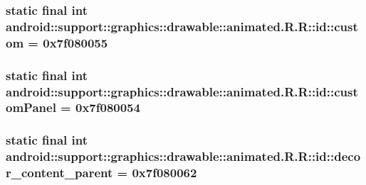 \hypertarget{classandroid_1_1support_1_1graphics_1_1drawable_1_1animated_1_1_r_1_1id_7882cd29792180a55eddba12ffd315d0}{
\subsubsection[{custom}]{\setlength{\rightskip}{0pt plus 5cm}static final int android::support::graphics::drawable::animated.R.R::id::custom = 0x7f080055}}
\label{classandroid_1_1support_1_1graphics_1_1drawable_1_1animated_1_1_r_1_1id_7882cd29792180a55eddba12ffd315d0}


\hypertarget{classandroid_1_1support_1_1graphics_1_1drawable_1_1animated_1_1_r_1_1id_a2cd3937e59c09bee81015d22dd5f1a5}{
\subsubsection[{customPanel}]{\setlength{\rightskip}{0pt plus 5cm}static final int android::support::graphics::drawable::animated.R.R::id::customPanel = 0x7f080054}}
\label{classandroid_1_1support_1_1graphics_1_1drawable_1_1animated_1_1_r_1_1id_a2cd3937e59c09bee81015d22dd5f1a5}


\hypertarget{classandroid_1_1support_1_1graphics_1_1drawable_1_1animated_1_1_r_1_1id_2f426070b2f8afeb416e9bd1456a2382}{
\subsubsection[{decor\_\-content\_\-parent}]{\setlength{\rightskip}{0pt plus 5cm}static final int android::support::graphics::drawable::animated.R.R::id::decor\_\-content\_\-parent = 0x7f080062}}
\label{classandroid_1_1support_1_1graphics_1_1drawable_1_1animated_1_1_r_1_1id_2f426070b2f8afeb416e9bd1456a2382}


